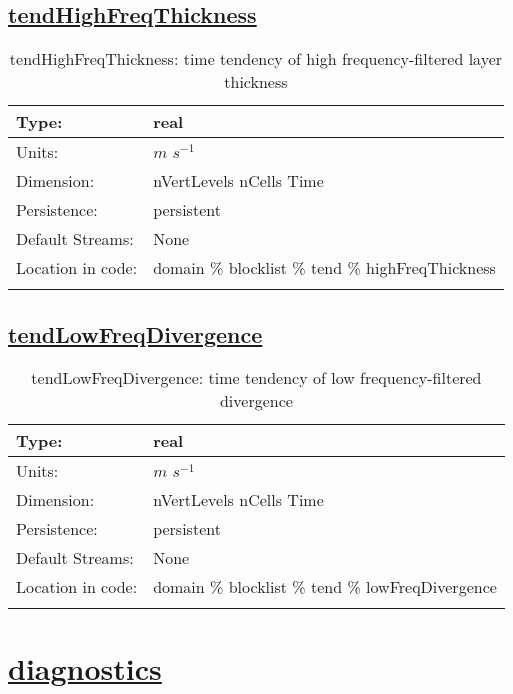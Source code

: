 \subsection[tendHighFreqThickness]{\hyperref[sec:var_tab_tend]{tendHighFreqThickness}}
\label{subsec:var_sec_tend_tendHighFreqThickness}
\begin{center}
\begin{longtable}{| p{2.0in} | p{4.0in} |}
        \hline 
        Type: & real \\
        \hline 
        Units: & $m$ $s^{-1}$ \\
        \hline 
        Dimension: & nVertLevels nCells Time \\
        \hline 
        Persistence: & persistent \\
        \hline 
		 Default Streams: & None \\
        \hline 
		 Location in code: & domain \% blocklist \% tend \% highFreqThickness \\
		 \hline 
    \caption{tendHighFreqThickness: time tendency of high frequency-filtered layer thickness}
\end{longtable}
\end{center}
\subsection[tendLowFreqDivergence]{\hyperref[sec:var_tab_tend]{tendLowFreqDivergence}}
\label{subsec:var_sec_tend_tendLowFreqDivergence}
\begin{center}
\begin{longtable}{| p{2.0in} | p{4.0in} |}
        \hline 
        Type: & real \\
        \hline 
        Units: & $m$ $s^{-1}$ \\
        \hline 
        Dimension: & nVertLevels nCells Time \\
        \hline 
        Persistence: & persistent \\
        \hline 
		 Default Streams: & None \\
        \hline 
		 Location in code: & domain \% blocklist \% tend \% lowFreqDivergence \\
		 \hline 
    \caption{tendLowFreqDivergence: time tendency of low frequency-filtered divergence}
\end{longtable}
\end{center}
\section[diagnostics]{\hyperref[sec:var_tab_diagnostics]{diagnostics}}
\label{sec:var_sec_diagnostics}
